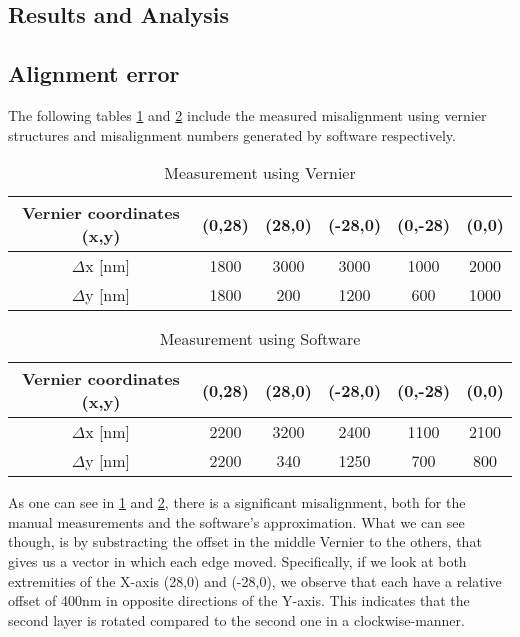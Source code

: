 \pagebreak
\subsection{Results and Analysis}
\subsection*{Alignment error}
The following tables \ref{table: Vernier} and \ref{table:software} include the measured misalignment using vernier structures and misalignment numbers generated by software respectively.
\begin{table}[ht]
    \centering
    \caption{Measurement using Vernier}
    \begin{tabular}[t]{|c|c|c|c|c|c|}
        \toprule
         \color{Tue-red}\textbf{Vernier coordinates (x,y) }&\color{Tue-red}\textbf{(0,28)}&\color{Tue-red}\textbf{(28,0)}&\color{Tue-red}\textbf{(-28,0)}&\color{Tue-red}\textbf{(0,-28)} & \color{Tue-red}\textbf{(0,0)}\\
        \midrule
        $\Delta$x [nm]&1800&3000&3000&1000& 2000\\
        $\Delta$y [nm]&1800&200&1200&600& 1000\\
        \bottomrule
    \end{tabular}
    \label{table: Vernier}
\end{table}
\begin{table}[ht]
    \centering
    \caption{Measurement using Software}
    \begin{tabular}[t]{|c|c|c|c|c|c|}
        \toprule
         \color{Tue-red}\textbf{Vernier coordinates (x,y) }&\color{Tue-red}\textbf{(0,28)}&\color{Tue-red}\textbf{(28,0)}&\color{Tue-red}\textbf{(-28,0)}&\color{Tue-red}\textbf{(0,-28)} & \color{Tue-red}\textbf{(0,0)}\\
        \midrule
        $\Delta$x [nm]&2200&3200&2400&1100& 2100\\
        $\Delta$y [nm]&2200&340&1250&700& 800\\
        \bottomrule
    \end{tabular}
    \label{table:software}
\end{table}

As one can see in \cref{table: Vernier} and \cref{table:software}, there is a significant misalignment, both for the manual measurements and the software's approximation.
What we can see though, is by substracting the offset in the middle Vernier to the others, that gives us a vector in which each edge moved. Specifically, if we look at both extremities of the X-axis (28,0) and (-28,0), we observe that each have a relative offset of 400nm in opposite directions of the Y-axis. This indicates that the second layer is rotated compared to the second one in a clockwise-manner.

